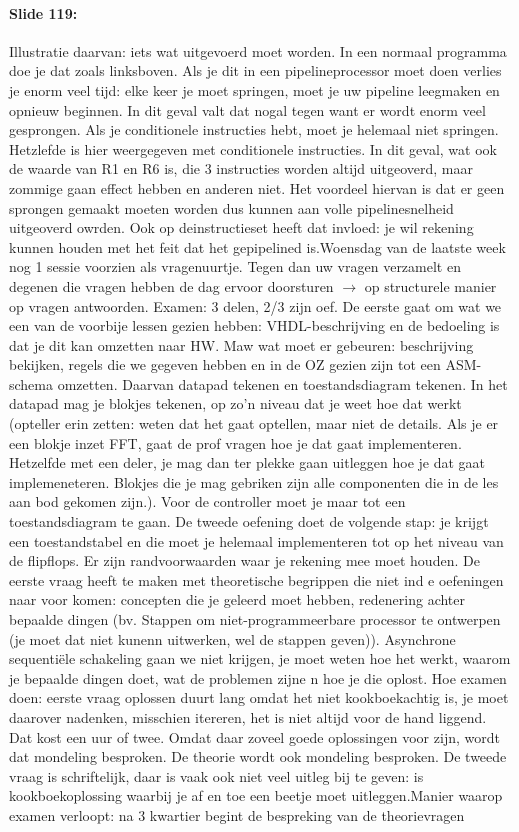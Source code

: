 \documentclass[10pt,a4paper]{book}
\begin{document}
\paragraph{Slide 119:} Illustratie daarvan: iets wat uitgevoerd moet worden. In een normaal programma doe je dat zoals linksboven. Als je dit in een pipelineprocessor moet doen verlies je enorm veel tijd: elke keer je moet springen, moet je uw pipeline leegmaken en opnieuw beginnen. In dit geval valt dat nogal tegen want er wordt enorm veel gesprongen. Als je conditionele instructies hebt, moet je helemaal niet springen. Hetzlefde is hier weergegeven met conditionele instructies. In dit geval, wat ook de waarde van R1 en R6 is, die 3 instructies worden altijd uitgeoverd, maar zommige gaan effect hebben en anderen niet. Het voordeel hiervan is dat er geen sprongen gemaakt moeten worden dus kunnen aan volle pipelinesnelheid uitgeoverd owrden. Ook op deinstructieset heeft dat invloed: je wil rekening kunnen houden met het feit dat het gepipelined is.Woensdag van de laatste week nog 1 sessie voorzien als vragenuurtje. Tegen dan uw vragen verzamelt en degenen die vragen hebben de dag ervoor doorsturen $\rightarrow$ op structurele manier op vragen antwoorden. Examen: 3 delen, 2/3 zijn oef. De eerste gaat om wat we een van de voorbije lessen gezien hebben: VHDL-beschrijving en de bedoeling is dat je dit kan omzetten naar HW. Maw wat moet er gebeuren: beschrijving bekijken, regels die we gegeven hebben en in de OZ gezien zijn tot een ASM-schema omzetten. Daarvan datapad tekenen en toestandsdiagram tekenen. In het datapad mag je blokjes tekenen, op zo'n niveau dat je weet hoe dat werkt (opteller erin zetten: weten dat het gaat optellen, maar niet de details. Als je er een blokje inzet FFT, gaat de prof vragen hoe je dat gaat implementeren. Hetzelfde met een deler, je mag dan ter plekke gaan uitleggen hoe je dat gaat implemeneteren. Blokjes die je mag gebriken zijn alle componenten die in de les aan bod gekomen zijn.). Voor de controller moet je maar tot een toestandsdiagram te gaan. De tweede oefening doet de volgende stap: je krijgt een toestandstabel en die moet je helemaal implementeren tot op het niveau van de flipflops. Er zijn randvoorwaarden waar je rekening mee moet houden. De eerste vraag heeft te maken met theoretische begrippen die niet ind e oefeningen naar voor komen: concepten die je geleerd moet hebben, redenering achter bepaalde dingen (bv. Stappen om niet-programmeerbare processor te ontwerpen (je moet dat niet kunenn uitwerken, wel de stappen geven)). Asynchrone sequenti\"ele schakeling gaan we niet krijgen, je moet weten hoe het werkt, waarom je bepaalde dingen doet, wat de problemen zijne n hoe je die oplost. Hoe examen doen: eerste vraag oplossen duurt lang omdat het niet kookboekachtig is, je moet daarover nadenken, misschien itereren, het is niet altijd voor de hand liggend. Dat kost een uur of twee. Omdat daar zoveel goede oplossingen voor zijn, wordt dat mondeling besproken. De theorie wordt ook mondeling besproken. De tweede vraag is schriftelijk, daar is vaak ook niet veel uitleg bij te geven: is kookboekoplossing waarbij je af en toe een beetje moet uitleggen.Manier waarop examen verloopt: na 3 kwartier begint de bespreking van de theorievragen 
\end{document}
